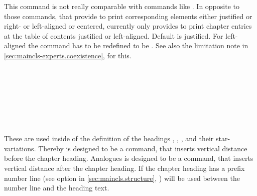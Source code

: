 \begin{Declaration}
\end{Declaration}
%
This command is not really comparable with commands like
. In opposite to those commands, that provide to print
corresponding elements either justified or right- or left-aligned or centered,
 currently only provides to print chapter entries at
the table of contents justified or left-aligned. Default is justified. For
left-aligned the command has to be redefined to be
. See
also the limitation note in \autoref{sec:maincls-experts.coexistence},
 for this.%
%

\begin{Declaration}
  \\
  \\
  \\
  \\
  \\
  \\
\end{Declaration}
%
%
%
%
%
%
%
These are used inside of the definition of the headings
, , ,
 and their star-variations. Thereby
 is designed to be a command, that inserts
vertical distance before the chapter heading. Analogues
 is designed to be a command, that inserts vertical
distance after the chapter heading. If the chapter heading has a prefix number line (see option
 in \autoref{sec:maincls.structure},
) 
will be used between the number line and the heading text.

